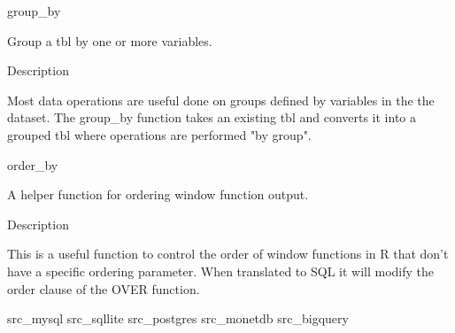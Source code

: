 
group\_by 

Group a tbl by one or more variables.

Description

Most data operations are useful done on groups defined by variables in the the dataset. The
group\_by function takes an existing tbl and converts it into a grouped tbl where operations are
performed "by group".


order\_by 

A helper function for ordering window function output.

Description

This is a useful function to control the order of window functions in R that don’t have a specific
ordering parameter. When translated to SQL it will modify the order clause of the OVER function.


src_mysql
src_sqllite
src_postgres
src_monetdb
src_bigquery

